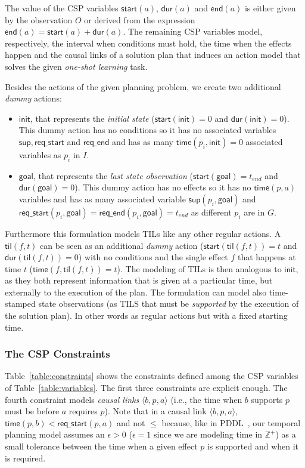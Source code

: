 \documentclass{ecai}
\newcommand{\tup}[1]{{\langle #1 \rangle}}
\newcommand{\dur}{\mathsf{dur}}    %
\newcommand{\start}{\mathsf{start}}%
\newcommand{\en}{\mathsf{end}}     %
\newcommand{\til}{\mathsf{til}}    %
\newcommand{\supp}{\mathsf{sup}}   %
\newcommand{\tim}{\mathsf{time}}   %
\newcommand{\reqs}{\mathsf{req\_{start}}} %
\newcommand{\reqe}{\mathsf{req\_{end}}}   %
\newcommand{\ini}{\mathsf{init}}   %
\newcommand{\goal}{\mathsf{goal}}  %
\begin{document}
The value of the CSP variables $\start(a)$, $\dur(a)$ and $\en(a)$ is either given by the observation $O$ or derived from the expression $\en(a)=\start(a)+\dur(a)$. The remaining CSP variables model, respectively, the interval when conditions must hold, the time when the effects happen and the causal links of a solution plan that induces an action model that solves the given {\em one-shot learning} task.

Besides the actions of the given planning problem, we create two additional {\em dummy} actions:
\begin{itemize}
\item $\ini$, that represents the {\em initial state} ($\start(\ini)=0$ and $\dur(\ini)=0$). This dummy action has no conditions so it has no associated variables $\supp, \reqs$ and $\reqe$ and has as many $\tim(p_i,\ini)=0$ associated variables as $p_i$ in $I$.
\item $\goal$, that represents the {\em last state observation} ($\start(\goal)=t_{end}$ and $\dur(\goal)=0$). This dummy action has no effects so it has no $\tim(p,a)$ variables and has as many associated variable $\supp(p_i,\goal)$ and $\reqs(p_i,\goal)=\reqe(p_i,\goal)=t_{end}$ as different $p_i$ are in $G$. 
\end{itemize}  

Furthermore this formulation models TILs like any other regular actions. A $\til(f,t)$ can be seen as an additional {\em dummy} action ($\start(\til(f,t))=t$ and $\dur(\til(f,t))=0$) with no conditions and the single effect $f$ that happens at time $t$ ($\tim(f,\til(f,t))=t$). The modeling of TILs is then analogous to $\ini$, as they both represent information that is given at a particular time, but externally to the execution of the plan. The formulation can model also time-stamped state observations (as TILS that must be {\em supported} by the execution of the solution plan). In other words as regular actions but with a fixed starting time.

\subsubsection{The CSP Constraints}
Table~\ref{table:constraints} shows the constraints defined among the CSP variables of Table~\ref{table:variables}. The first three constraints are explicit enough. The fourth constraint models {\em causal links} $\tup{b,p,a}$ (i.e., the time when $b$ supports $p$ must be before $a$ requires $p$). Note that in a causal link $\tup{b,p,a}$, $\tim(p,b) < \reqs(p,a)$ and not $\leq$ because, like in PDDL~\cite{fox2003pddl2}, our temporal planning model assumes an $\epsilon > 0$ ($\epsilon=1$ since we are modeling time in $\mathbb{Z}^+$) as a small tolerance between the time when a given effect $p$ is supported and when it is required. 
\end{document}
